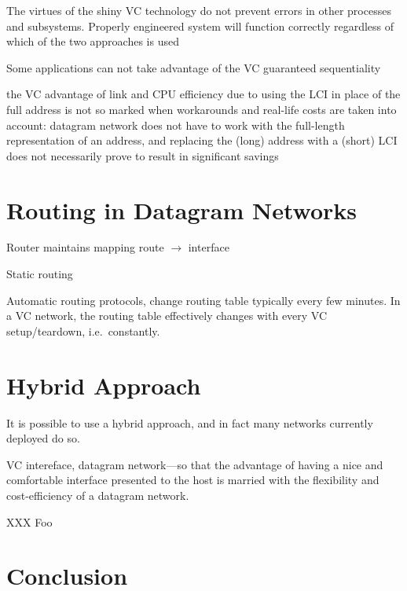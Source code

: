 \documentclass[10pt]{report}
\begin{document}
The virtues of the shiny VC technology do not prevent errors in other processes and subsystems.  Properly engineered system will function correctly regardless of which of the two approaches is used \cite[p161]{russell}

Some applications can not take advantage of the VC guaranteed sequentiality \cite[p161]{russell}

the VC advantage of link and CPU efficiency due to using the LCI in place of the full address is not so marked when workarounds and real-life costs are taken into account: datagram network does not have to work with the full-length representation of an address, and replacing the (long) address with a (short) LCI does not necessarily prove to result in significant savings \cite[p161]{russell}

\section{Routing in Datagram Networks}

Router maintains mapping route $\rightarrow$ interface

Static routing

Automatic routing protocols, change routing table typically every few minutes. \cite{xxx}  In a VC network, the routing table effectively changes with every VC setup/teardown, i.e.\ constantly.

\section{Hybrid Approach}

It is possible to use a hybrid approach, and in fact many networks currently deployed do so.

VC intereface, datagram network---so that the advantage of having a nice and comfortable interface presented to the host is married with the flexibility and cost-efficiency of a datagram network.





XXX Foo \cite{xxx} \cite{kurose} \cite{russell} \cite{stallings}\\
\cite{slides-lecture-2}
\cite{slides-lecture-6}
\cite{crowcroft}

\section{Conclusion}
\end{document}
